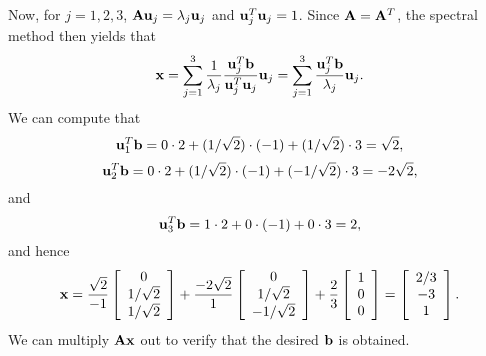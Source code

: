 \begin{solution}
\begin{enumerate}
Now, for $j=1,2,3$, ${\bf A}{\bf u}_j=\lambda_j{\bf u}_j$ and ${\bf u}_j^T {\bf u}_j=1$. Since ${\bf A}={\bf A}^T$, the spectral method then yields that
         \[ {\bf x} = \sum_{j=1}^3 {1 \over \lambda_j} {{\bf u}_j^T{\bf b} \over {\bf u}_j^T {\bf u}_j} {\bf u}_j = \sum_{j=1}^3 {{\bf u}_j^T{\bf b} \over \lambda_j} {\bf u}_j.\]
      We can compute that
          \[ {\bf u}_1^T{\bf b} = 0\cdot 2 + (1/\sqrt{2}) \cdot (-1) + (1/\sqrt{2}) \cdot 3 = \sqrt{2}, \]
          \[ {\bf u}_2^T{\bf b} = 0\cdot 2 + (1/\sqrt{2}) \cdot (-1) + (-1/\sqrt{2}) \cdot 3 = -2\sqrt{2}, \]
and
          \[ {\bf u}_3^T{\bf b} = 1\cdot 2 + 0 \cdot (-1) + 0 \cdot 3 = 2, \]
and hence
\[ {\bf x} =   {\sqrt{2} \over -1} \left[\begin{array}{c} 0 \\ 1/\sqrt{2} \\ 1/\sqrt{2}\end{array}\right]
         + {-2\sqrt{2} \over 1} \left[\begin{array}{c}0 \\ 1/\sqrt{2} \\ -1/\sqrt{2}\end{array}\right]
         + {2 \over 3} \left[\begin{array}{c}1 \\ 0 \\ 0\end{array}\right]
       =   \left[\begin{array}{c}2/3 \\ -3\\ 1\end{array}\right].\]
We can multiply ${\bf A}{\bf x}$ out to verify that the desired ${\bf b}$ is obtained.
\end{enumerate} 
\end{solution}